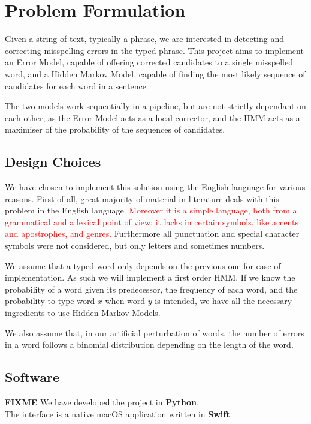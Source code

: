 \chapter{Problem Formulation}

Given a string of text, typically a phrase, we are interested in detecting and correcting misspelling errors in the 
typed phrase. This project aims to implement an Error Model, capable of offering corrected candidates to a single 
misspelled word, and a Hidden Markov Model, capable of finding the most likely sequence of candidates for each word in 
a sentence.

The two models work sequentially in a pipeline, but are not strictly dependant on each other, as the Error Model 
acts as a local corrector, and the HMM acts as a maximiser of the probability of the sequences of candidates.

\section{Design Choices}

We have chosen to implement this solution using the English language for various reasons. First of all, great 
majority of material in literature deals with this problem in the English language. \textcolor{red}{Moreover it is a 
simple language, both from a grammatical and a lexical point of view: it lacks in certain symbols, like accents 
and apostrophes, and genres. }
Furthermore all punctuation and special character symbols were not considered, but only letters and sometimes 
numbers. 

We assume that a typed word only depends on the previous one for ease of implementation. As such we will implement a first order HMM. 
If we know the probability of a word given its predecessor, the frequency of each word, and the probability to 
type word $x$ when word $y$ is intended, we have all the necessary ingredients to use Hidden Markov Models.

We also assume that, in our artificial perturbation of words, the number of errors in a word follows a binomial 
distribution depending on the length of the word.

\section{Software}
\textbf{FIXME}
We have developed the project in \textbf{Python}.\\
The interface is a native macOS application written in \textbf{Swift}.